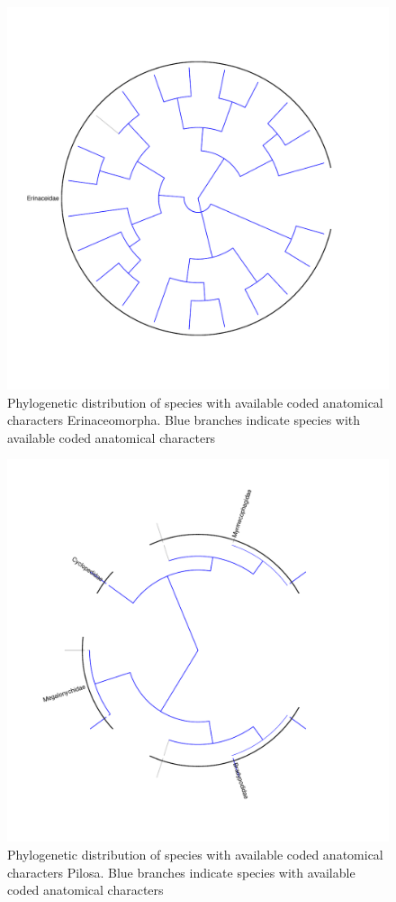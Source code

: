 \documentclass[12pt,letterpaper]{article}
\begin{document}
\begin{figure}[!htbp]
\centering
    \includegraphics[width=1\textwidth]{Supp_figure_ERINACEOMORPHA.pdf}
\caption{Phylogenetic distribution of species with available coded anatomical characters Erinaceomorpha. Blue branches indicate species with available coded anatomical characters}
\label{Supp_Figure_Phylo-Erinaceomorpha}
\end{figure}

\begin{figure}[!htbp]
\centering
    \includegraphics[width=1\textwidth]{Supp_figure_PILOSA.pdf}
\caption{Phylogenetic distribution of species with available coded anatomical characters Pilosa. Blue branches indicate species with available coded anatomical characters}
\label{Supp_Figure_Phylo-Pilosa}
\end{figure}
\end{document}
